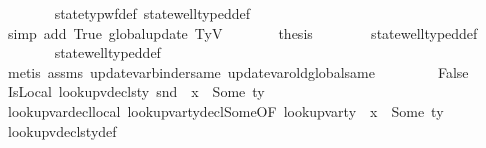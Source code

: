 \begin{isabellebody}
\ \ \ \ \ \ \isamarkupfalse%
\ state{\isacharunderscore}{\kern0pt}typ{\isacharunderscore}{\kern0pt}wf{\isacharunderscore}{\kern0pt}def\ state{\isacharunderscore}{\kern0pt}well{\isacharunderscore}{\kern0pt}typed{\isacharunderscore}{\kern0pt}def\isanewline
\ \ \ \ \ \ \isamarkupfalse%
\ {\isacharparenleft}{\kern0pt}simp\ add{\isacharcolon}{\kern0pt}\ True\ global{\isacharunderscore}{\kern0pt}update\ TyV{\isacharparenright}{\kern0pt}\isanewline
\ \ \ \ \isamarkupfalse%
\ \isamarkupfalse%
\ {\isacharquery}{\kern0pt}thesis\isanewline
\ \ \ \ \ \ \isamarkupfalse%
\ state{\isacharunderscore}{\kern0pt}well{\isacharunderscore}{\kern0pt}typed{\isacharunderscore}{\kern0pt}def\isanewline
\ \ \ \ \ \ \isamarkupfalse%
\ state{\isacharunderscore}{\kern0pt}well{\isacharunderscore}{\kern0pt}typed{\isacharunderscore}{\kern0pt}def\isanewline
\ \ \ \ \ \ \isamarkupfalse%
\ {\isacharparenleft}{\kern0pt}metis\ assms{\isacharparenleft}{\kern0pt}{}{\isacharparenright}{\kern0pt}\ update{\isacharunderscore}{\kern0pt}var{\isacharunderscore}{\kern0pt}binder{\isacharunderscore}{\kern0pt}same\ update{\isacharunderscore}{\kern0pt}var{\isacharunderscore}{\kern0pt}old{\isacharunderscore}{\kern0pt}global{\isacharunderscore}{\kern0pt}same{\isacharparenright}{\kern0pt}\isanewline
\ \ \isamarkupfalse%
\isanewline
\ \ \ \ \isamarkupfalse%
\ False\isanewline
\ \ \ \ \isamarkupfalse%
\ IsLocal{\isacharcolon}{\kern0pt}\ {\isachardoublequoteopen}lookup{\isacharunderscore}{\kern0pt}vdecls{\isacharunderscore}{\kern0pt}ty\ {\isacharparenleft}{\kern0pt}snd\ {\isasymLambda}{\isacharparenright}{\kern0pt}\ x\ {\isacharequal}{\kern0pt}\ Some\ ty{\isachardoublequoteclose}\isanewline
\ \ \ \ \ \ \isamarkupfalse%
\ lookup{\isacharunderscore}{\kern0pt}var{\isacharunderscore}{\kern0pt}decl{\isacharunderscore}{\kern0pt}local{\isacharunderscore}{\kern0pt}{}\ lookup{\isacharunderscore}{\kern0pt}var{\isacharunderscore}{\kern0pt}ty{\isacharunderscore}{\kern0pt}decl{\isacharunderscore}{\kern0pt}Some{\isacharbrackleft}{\kern0pt}OF\ {\isacartoucheopen}lookup{\isacharunderscore}{\kern0pt}var{\isacharunderscore}{\kern0pt}ty\ {\isasymLambda}\ x\ {\isacharequal}{\kern0pt}\ Some\ ty{\isacartoucheclose}{\isacharbrackright}{\kern0pt}\isanewline
\ \ \ \ \ \ \isamarkupfalse%
\ lookup{\isacharunderscore}{\kern0pt}vdecls{\isacharunderscore}{\kern0pt}ty{\isacharunderscore}{\kern0pt}def\ \ \ \ \ \ \isanewline

\end{isabellebody}
